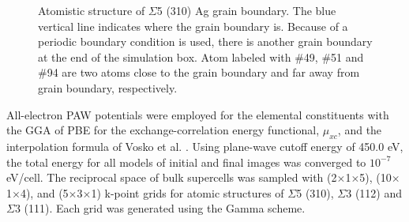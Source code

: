 \begingroup
\begin{figure}[!ht]
  \centering
  \caption[Atomistic structure of $\Sigma$5 (310) Ag grain boundary.]{Atomistic structure of $\Sigma$5 (310) Ag grain boundary. The blue vertical line indicates where the grain boundary is. Because of a periodic boundary condition is used, there is another grain boundary at the end of the simulation box. Atom labeled with \#49, \#51 and \#94 are two atoms close to the grain boundary and far away from grain boundary, respectively.}
  \label{Chap:Ag/ZnO:fig16}
\end{figure}
\endgroup


All-electron \ac{PAW} potentials were employed for the elemental constituents with the \ac{GGA} of \ac{PBE} for the exchange-correlation energy functional, $\mu_{xc}$, and the interpolation formula of Vosko et al. \cite{vosko1980accurate}. Using plane-wave cutoff energy of 450.0 eV, the total energy for all models of initial and final images was converged to $10^{−7}$ eV/cell. The reciprocal space of bulk supercells was sampled with (2$\times$1$\times$5), (10$\times$1$\times$4), and (5$\times$3$\times$1) k-point grids for atomic structures of $\Sigma$5 (310), $\Sigma$3 (112) and $\Sigma$3 (111). Each grid was generated using the Gamma scheme.



